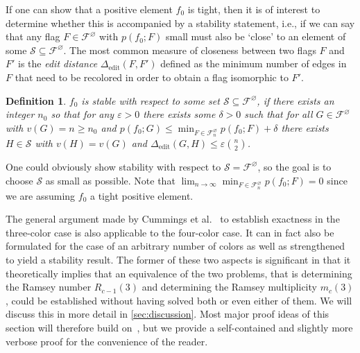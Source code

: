 \documentclass[a4paper,11pt]{article}
\newtheorem{definition}[theorem]{Definition}
\numberwithin{equation}{section}
\newcommand{\mF}{\mathcal{F}}
\newcommand{\mS}{\mathcal{S}}
\begin{document}
If one can show that a positive element $f_0$ is tight, then it is of interest to determine whether this is accompanied by a stability statement, i.e., if we can say that any flag $F \in \mF^\varnothing$ with $p(f_0; F)$ small must also be {\lq}close{\rq} to an element of some $\mS \subseteq \mF^\varnothing$.
%
 The most common measure of closeness between two flags $F$ and $F'$ is the \emph{edit distance} $\Delta_{\operatorname{edit}}(F, F')$ defined as the minimum number of edges in $F$ that need to be recolored in order to obtain a flag isomorphic to $F'$.
\begin{definition}\label{def:stability}
    $f_0$ is \emph{stable} with respect to some set $\mS\subseteq \mF^\varnothing$, if there exists an integer $n_0$ so that for any $\varepsilon > 0$ there exists some $\delta > 0$ such that for all $G\in\mF^\varnothing$ with $v(G) = n\ge n_0$ and $p(f_0; G) \leq \min_{F\in\mF^\varnothing_{n}}p(f_0;F) + \delta$ there exists $H\in\mS$ with $v(H)=v(G)$ and $\Delta_{\operatorname{edit}}(G,H) \le \varepsilon \binom{n}{2}$.
\end{definition}

One could obviously show stability with respect to $\mS = \mF^\varnothing$, so the goal is to choose $\mS$ as small as possible. Note that $\lim_{n \to \infty} \min_{F\in\mF^\varnothing_n}p(f_0;F) = 0$ since we are assuming $f_0$ a tight positive element. %

The general argument made by Cummings et al.~\cite{CummingsEtAl_2013} to establish exactness in the three-color case is also applicable to the four-color case. It can in fact also be formulated for the case of an arbitrary number of colors as well as strengthened to yield a stability result. The former of these two aspects is significant in that it theoretically implies that an equivalence of the two problems, that is determining the Ramsey number $R_{c-1}(3)$ and determining the Ramsey multiplicity $m_c(3)$, could be established without having solved both or even either of them. We will discuss this in more detail in \cref{sec:discussion}.
Most major proof ideas of this section will therefore build on~\cite{CummingsEtAl_2013}, but we provide a self-contained and slightly more verbose proof for the convenience of the reader.
\end{document}
